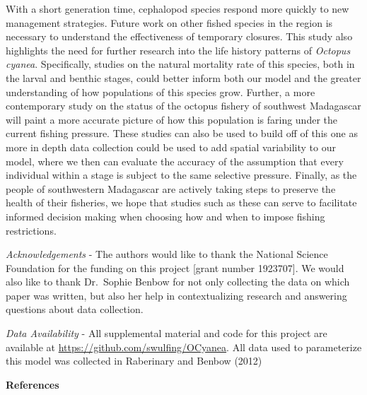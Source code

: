 \documentclass[
]{article}
\begin{document}
With a short generation time, cephalopod species respond more quickly to new management strategies. Future work on other fished species in the region is necessary to understand the effectiveness of temporary closures. This study also highlights the need for further research into the life history patterns of \emph{Octopus cyanea}. Specifically, studies on the natural mortality rate of this species, both in the larval and benthic stages, could better inform both our model and the greater understanding of how populations of this species grow. Further, a more contemporary study on the status of the octopus fishery of southwest Madagascar will paint a more accurate picture of how this population is faring under the current fishing pressure. These studies can also be used to build off of this one as more in depth data collection could be used to add spatial variability to our model, where we then can evaluate the accuracy of the assumption that every individual within a stage is subject to the same selective pressure. Finally, as the people of southwestern Madagascar are actively taking steps to preserve the health of their fisheries, we hope that studies such as these can serve to facilitate informed decision making when choosing how and when to impose fishing restrictions.

\emph{Acknowledgements} - The authors would like to thank the National Science Foundation for the funding on this project {[}grant number 1923707{]}. We would also like to thank Dr.~Sophie Benbow for not only collecting the data on which paper was written, but also her help in contextualizing research and answering questions about data collection.

\emph{Data Availability} - All supplemental material and code for this project are available at \url{https://github.com/swulfing/OCyanea}. All data used to parameterize this model was collected in Raberinary and Benbow (2012)

\newpage

\textbf{References}
\end{document}
